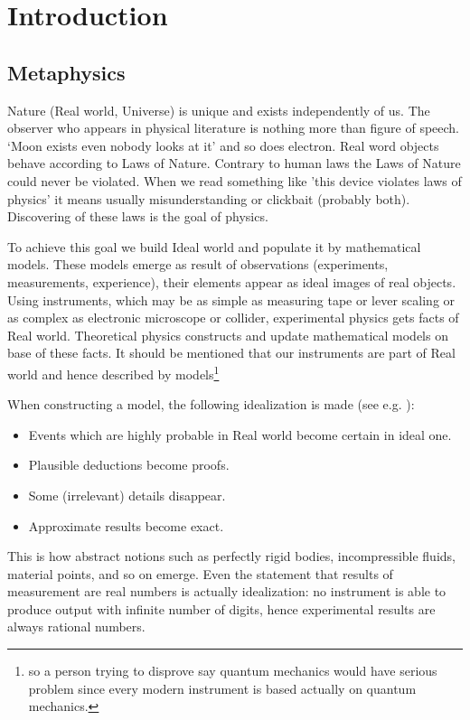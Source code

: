 \chapter {Introduction}
\label{introduction}
\section{Metaphysics}
\label {metaphysics}
Nature (Real world, Universe) is unique and exists independently of us. The observer who appears in physical
literature is nothing more than figure of speech. `Moon exists even nobody looks at it' and so does electron.
Real word objects behave according to Laws of Nature. Contrary to human laws the Laws of Nature could never be violated.
When we read something like 'this device violates laws of physics' it means usually misunderstanding or clickbait (probably both). Discovering of these laws is the goal of physics. 

To achieve this goal
we build Ideal world and populate it by mathematical models. These models emerge as result of  observations (experiments, measurements, experience), 
their elements appear as ideal images of real objects. Using instruments, 
which may be as simple as measuring tape or lever scaling or as complex as electronic microscope or collider, experimental physics gets facts of Real world.
Theoretical physics constructs and update mathematical models 
on base of these facts.
It should be mentioned that our instruments are part of Real world  and hence described by models\footnote{so a person trying 
to disprove say quantum mechanics would have serious problem since every modern instrument is based actually on quantum 
mechanics.}

    When constructing a model, the following idealization is
   made (see e.g. \cite{Arnold-mt}): 
\begin{itemize}
    \item Events which are  highly probable in Real world become certain in ideal one.
    \item Plausible deductions become proofs.
    \item Some (irrelevant) details disappear.
    \item Approximate results become exact.
\end{itemize}               

This is how abstract notions such as perfectly rigid bodies, incompressible fluids, material points, and so on emerge. 
Even the statement that results of measurement are real numbers is actually idealization: no instrument is able to produce output with infinite number of digits, hence experimental results are always rational numbers.

